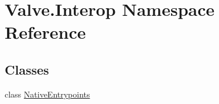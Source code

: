 \hypertarget{namespaceValve_1_1Interop}{}\section{Valve.\+Interop Namespace Reference}
\label{namespaceValve_1_1Interop}
\subsection*{Classes}
\begin{DoxyCompactItemize}
\item 
class \hyperlink{classValve_1_1Interop_1_1NativeEntrypoints}{Native\+Entrypoints}
\end{DoxyCompactItemize}
